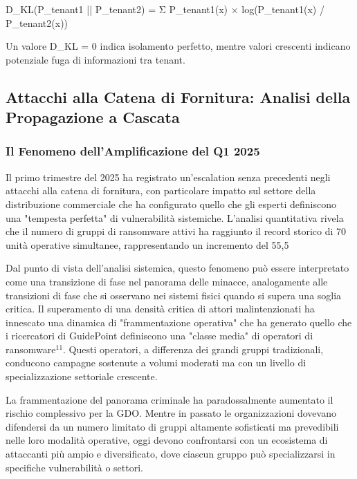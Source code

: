 {D_KL(P_tenant1 || P_tenant2) = Σ P_tenant1(x) × log(P_tenant1(x) / P_tenant2(x))

Un valore D_KL = 0 indica isolamento perfetto, mentre valori crescenti indicano potenziale fuga di informazioni tra tenant.

\subsection{Attacchi alla Catena di Fornitura: Analisi della Propagazione a Cascata}

\subsubsection{Il Fenomeno dell'Amplificazione del Q1 2025}

Il primo trimestre del 2025 ha registrato un'escalation senza precedenti negli attacchi alla catena di fornitura, con particolare impatto sul settore della distribuzione commerciale che ha configurato quello che gli esperti definiscono una "tempesta perfetta" di vulnerabilità sistemiche. L'analisi quantitativa rivela che il numero di gruppi di ransomware attivi ha raggiunto il record storico di 70 unità operative simultanee, rappresentando un incremento del 55,5%

Dal punto di vista dell'analisi sistemica, questo fenomeno può essere interpretato come una transizione di fase nel panorama delle minacce, analogamente alle transizioni di fase che si osservano nei sistemi fisici quando si supera una soglia critica. Il superamento di una densità critica di attori malintenzionati ha innescato una dinamica di "frammentazione operativa" che ha generato quello che i ricercatori di GuidePoint definiscono una "classe media" di operatori di ransomware$^{11}$. Questi operatori, a differenza dei grandi gruppi tradizionali, conducono campagne sostenute a volumi moderati ma con un livello di specializzazione settoriale crescente.

La frammentazione del panorama criminale ha paradossalmente aumentato il rischio complessivo per la GDO. Mentre in passato le organizzazioni dovevano difendersi da un numero limitato di gruppi altamente sofisticati ma prevedibili nelle loro modalità operative, oggi devono confrontarsi con un ecosistema di attaccanti più ampio e diversificato, dove ciascun gruppo può specializzarsi in specifiche vulnerabilità o settori.

}
